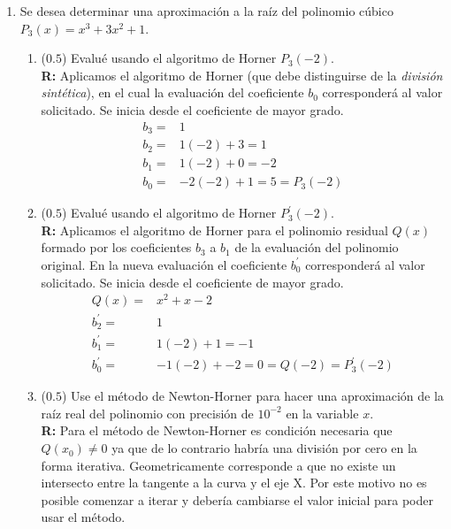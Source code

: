 \documentclass[12pt]{article}
\begin{document}
\begin{enumerate}[leftmargin=*,widest=9]
\begin{enumerate}[label=\alph*]
    \end{enumerate}


    \item Se desea determinar una aproximación a la raíz del polinomio cúbico \(P_3(x)=x^3+3x^2+1\).


    \begin{enumerate}[label=\alph*]
    \item (\(0.5\)) Evalué usando el algoritmo de Horner \(P_3(-2)\).\\
		\textbf{R:} Aplicamos el algoritmo de Horner (que debe distinguirse de la \textit{división sintética}), en el cual la evaluación del coeficiente \(b_0\) corresponderá al valor solicitado. Se inicia desde el coeficiente de mayor grado.\\
		\begin{eqnarray*}
		b_3 = &1\\
		b_2 = &1(-2) + 3 = 1\\
		b_1 = &1(-2) + 0 = -2\\
		b_0 = &-2(-2) + 1 = 5 = P_3(-2)
		\end{eqnarray*}



    \item (\(0.5\)) Evalué usando el algoritmo de Horner \(P^{\prime}_3(-2)\).\\
		\textbf{R:} Aplicamos el algoritmo de Horner para el polinomio residual \(Q(x)\) formado por los coeficientes \(b_3\) a \(b_1\) de la evaluación del polinomio original. En la nueva evaluación el coeficiente \(b^{\prime}_0\) corresponderá al valor solicitado. Se inicia desde el coeficiente de mayor grado.\\
		\begin{eqnarray*}
		Q(x) = &x^2 + x - 2\\
		b^{\prime}_2 = &1\\
		b^{\prime}_1 = &1(-2) +1 = -1\\
		b^{\prime}_0 = &-1(-2) + -2 = 0 = Q(-2) = P^{\prime}_3(-2)
		\end{eqnarray*}


    \item (\(0.5\)) Use el método de Newton-Horner para hacer una aproximación de la raíz real del polinomio con precisión de \(10^{-2}\) en la variable \(x\).\\
		\textbf{R:} Para el método de Newton-Horner es condición necesaria que \(Q(x_0) \neq 0\) ya que de lo contrario habría una división por cero en la forma iterativa. Geometricamente corresponde a que no existe un intersecto entre la tangente a la curva y el eje X. Por este motivo no es posible comenzar a iterar y debería cambiarse el valor inicial para poder usar el método.




\end{enumerate}
\end{enumerate}
\end{document}
